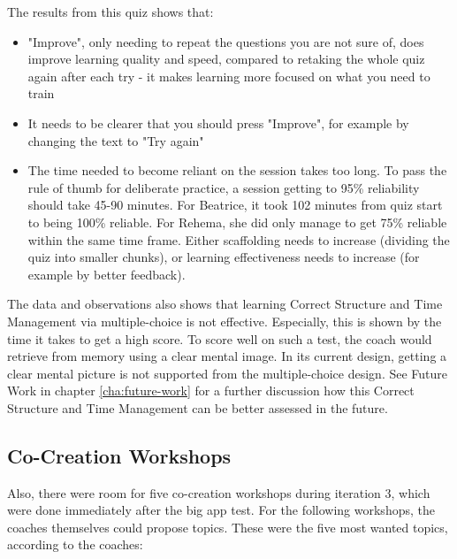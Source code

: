   The results from this quiz shows that:
  \begin{itemize}
  \item "Improve", only needing to repeat the questions you are not sure of, does improve learning quality and speed, compared to retaking the whole quiz again after each try - it makes learning more focused on what you need to train
  \item It needs to be clearer that you should press "Improve", for example by changing the text to "Try again"
  \item The time needed to become reliant on the session takes too long. To pass the rule of thumb for deliberate practice, a session getting to 95\% reliability should take 45-90 minutes. For Beatrice, it took 102 minutes from quiz start to being 100\% reliable. For Rehema, she did only manage to get 75\% reliable within the same time frame. Either scaffolding needs to increase (dividing the quiz into smaller chunks), or learning effectiveness needs to increase (for example by better feedback).
  \end{itemize}

The data and observations also shows that learning Correct Structure and Time Management via multiple-choice is not effective. Especially, this is shown by the time it takes to get a high score. To score well on such a test, the coach would retrieve from memory using a clear mental image. In its current design, getting a clear mental picture is not supported from the multiple-choice design. See Future Work in chapter \ref{cha:future-work} for a further discussion how this Correct Structure and Time Management can be better assessed in the future.

\subsection{Co-Creation Workshops}

  Also, there were room for five co-creation workshops during iteration 3, which were done immediately after the big app test. For the following workshops, the coaches themselves could propose topics. These were the five most wanted topics, according to the coaches:

